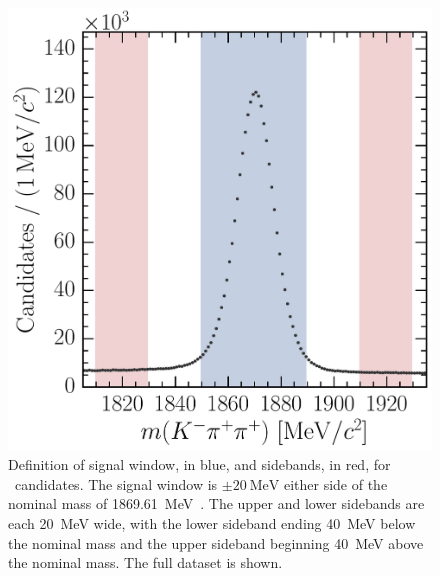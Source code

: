 \begin{figure}
  \centering
  \includegraphics[width=\textwidth]{figures/production/fitting/DpToKpipi_mass_offline_selection_regions}
  \caption{%
    Definition of signal window, in blue, and sidebands, in red, for 
    \DpToKpipi\ candidates.
    The signal window is $\pm\SI{20}{\MeV}$ either side of the nominal \PDplus 
    mass of \SI{1869.61}{\MeV}~\cite{PDG2014}.
    The upper and lower sidebands are each \SI{20}{\MeV} wide, with the lower 
    sideband ending \SI{40}{\MeV} below the nominal \PDplus mass and the upper 
    sideband beginning \SI{40}{\MeV} above the nominal \PDplus mass.
    The full dataset is shown.
  }
  \label{fig:prod:fitting:regions:DpToKpipi}
\end{figure}

